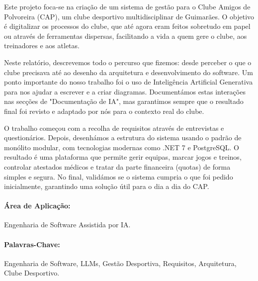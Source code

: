 \documentclass[a4paper,12pt]{scrreprt}
\begin{document}

\makecover



\renewenvironment{abstract}
 {\par\noindent\textbf{\Large\abstractname}\par\bigskip}
 {}

\begin{flushleft}
\begin{abstract}
Este projeto foca-se na criação de um sistema de gestão para o Clube Amigos de Polvoreira (CAP), um clube desportivo multidisciplinar de Guimarães. O objetivo é digitalizar os processos do clube, que até agora eram feitos sobretudo em papel ou através de ferramentas dispersas, facilitando a vida a quem gere o clube, aos treinadores e aos atletas.

Neste relatório, descrevemos todo o percurso que fizemos: desde perceber o que o clube precisava até ao desenho da arquitetura e desenvolvimento do software. Um ponto importante do nosso trabalho foi o uso de Inteligência Artificial Generativa para nos ajudar a escrever e a criar diagramas. Documentámos estas interações nas secções de "Documentação de IA", mas garantimos sempre que o resultado final foi revisto e adaptado por nós para o contexto real do clube.

O trabalho começou com a recolha de requisitos através de entrevistas e questionários. Depois, desenhámos a estrutura do sistema usando o padrão de monólito modular, com tecnologias modernas como .NET 7 e PostgreSQL. O resultado é uma plataforma que permite gerir equipas, marcar jogos e treinos, controlar atestados médicos e tratar da parte financeira (quotas) de forma simples e segura. No final, validámos se o sistema cumpria o que foi pedido inicialmente, garantindo uma solução útil para o dia a dia do CAP.

    \paragraph*{Área de Aplicação:} Engenharia de Software Assistida por IA.
    \paragraph*{Palavras-Chave:} Engenharia de Software, LLMs, Gestão Desportiva, Requisitos, Arquitetura, Clube Desportivo.
\end{abstract}
\end{flushleft}
\end{document}
